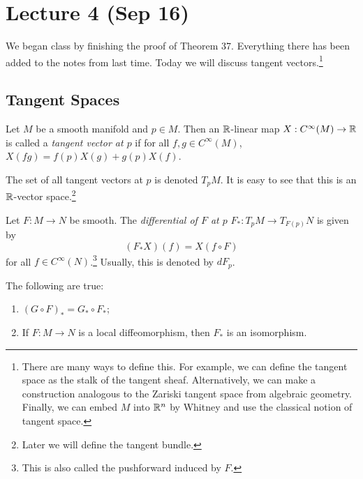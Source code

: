 \documentclass[twoside, 10pt]{article}
\begin{document}
    \section{Lecture 4 (Sep 16)}%

    We began class by finishing the proof of Theorem 37. Everything there has
    been added to the notes from last time. Today we will discuss tangent
    vectors.\footnote{There are many ways to define this. For example, we can
    define the tangent space as the stalk of the tangent sheaf. Alternatively,
we can make a construction analogous to the Zariski tangent space from
algebraic geometry. Finally, we can embed $M$ into $\mathbb{R}^n$ by Whitney and use
the classical notion of tangent space.}

    \subsection{Tangent Spaces}%
    
    
    \begin{defn} Let $M$ be a smooth manifold and $p \in M$. Then an
    $\mathbb{R}$-linear map $X: C^{\infty}(M) \to \mathbb{R}$ is called a \textit{ tangent
vector at $p$ } if for all $f,g \in C^{\infty}(M)$, $X(fg) = f(p)X(g) +
g(p)X(f)$.  \end{defn}

    \begin{notn} The set of all tangent vectors at $p$ is denoted $T_pM$. It is
    easy to see that this is an $\mathbb{R}$-vector space.\footnote{Later we will
define the tangent bundle.} \end{notn}

    \begin{defn} Let $F:M \to N$ be smooth. The \textit{differential of $F$ at
        $p$} $F_*: T_pM \to T_{F(p)}N$ is given by \[(F_*X)(f) = X(f \circ F)\]
        for all $f \in C^{\infty}(N)$.\footnote{This is also called the
        pushforward induced by $F$.} Usually, this is denoted by $dF_p$.
    \end{defn}

    \begin{prop} The following are true: \begin{enumerate} \item $(G \circ F)_*
    = G_* \circ F_*$; \item If $F: M \to N$ is a local diffeomorphism, then
    $F_*$ is an isomorphism.  \end{enumerate} \end{prop}
\end{document}
